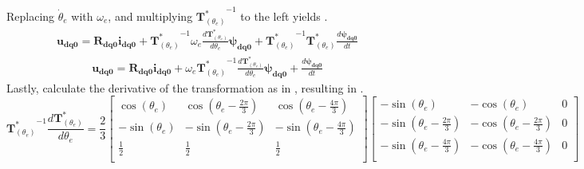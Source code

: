 Replacing $\dot{\theta}_e$ with $\omega_e$, and multiplying ${\mathbf{T}^*_{(\theta_e)}}^{-1}$ to the left yields .
\begin{equation}
	\begin{aligned}
		\mathbf{u_{dq0}}
		=
		\mathbf{R_{dq0}}\mathbf{i_{dq0}}
		+{\mathbf{T}^*_{(\theta_e)}}^{-1}\omega_e\frac{d\mathbf{T}^*_{(\theta_e)}}{d\theta_e}\pmb{\psi_{dq0}}
		+{\mathbf{T}^*_{(\theta_e)}}^{-1}\mathbf{T}^*_{(\theta_e)}\frac{d \pmb{\psi_{dq0}}}{dt}
	\end{aligned}
	\label{eq:flx_voltage_balance_abc_to_dq_transform}
\end{equation}
\begin{equation}
	\begin{aligned}
		\mathbf{u_{dq0}}
		=
		\mathbf{R_{dq0}}\mathbf{i_{dq0}}
		+\omega_e{\mathbf{T}^*_{(\theta_e)}}^{-1}\frac{d\mathbf{T}^*_{(\theta_e)}}{d\theta_e}\pmb{\psi_{dq0}}
		+\frac{d \pmb{\psi_{dq0}}}{dt}
	\end{aligned}
	\label{eq:flx_voltage_balance_abc_to_dq_transform1}
\end{equation}
Lastly, calculate the derivative of the transformation as in , resulting in .
\begin{equation}
	{\mathbf{T}^*_{(\theta_e)}}^{-1}\frac{d\mathbf{T}^*_{(\theta_e)}}{d\theta_e} = 	\frac{2}{3}
	\begin{bmatrix}
		\cos{\left(\theta_e\right)}		&	\cos{\left(\theta_e-\frac{2\pi}{3}\right)}		&	\cos{\left(\theta_e-\frac{4\pi}{3}\right)}	\\
		-\sin{\left(\theta_e\right)} 	&	-\sin{\left(\theta_e-\frac{2\pi}{3}\right)}		&	-\sin{\left(\theta_e-\frac{4\pi}{3}\right)}	\\
		\frac{1}{2}						&					\frac{1}{2}						&				 \frac{1}{2}					 \\
	\end{bmatrix}
	\begin{bmatrix}
		-\sin{\left(\theta_e\right)}                & -\cos{\left(\theta_e\right)}                & 0 \\
		-\sin{\left(\theta_e-\frac{2\pi}{3}\right)} & -\cos{\left(\theta_e-\frac{2\pi}{3}\right)} & 0 \\
		-\sin{\left(\theta_e-\frac{4\pi}{3}\right)} & -\cos{\left(\theta_e-\frac{4\pi}{3}\right)} & 0 \\
	\end{bmatrix}
	\label{eq:transformation_derivative_ampl}
\end{equation}
